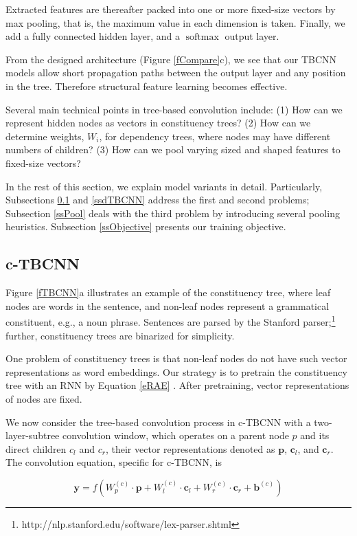 \documentclass[11pt,a4paper]{article}
\begin{document}
Extracted features are thereafter packed into one or more fixed-size vectors by max pooling, that is, the maximum value in each dimension is taken.
Finally, we add a fully connected hidden layer, and a $\operatorname{softmax}$ output layer.

From the designed architecture (Figure \ref{fCompare}c), we see that our TBCNN models allow short
propagation paths between the output layer and any position in the tree.
Therefore structural feature learning becomes effective.

Several main technical points in tree-based convolution include:
(1) How can we represent hidden nodes as vectors in constituency trees?
(2) How can we determine weights, $W_i$, for dependency trees, where nodes
may have different numbers of children?
(3) How can we pool varying sized and shaped features to fixed-size vectors?

In the rest of this section, we explain model variants in detail.
Particularly, Subsections \ref{sscTBCNN} and \ref{ssdTBCNN} address the first and second problems;
Subsection \ref{ssPool} deals with the third problem by introducing several pooling heuristics.
Subsection \ref{ssObjective} presents our training objective.
\subsection{c-TBCNN}\label{sscTBCNN}

Figure \ref{fTBCNN}a illustrates an example of the constituency tree, where
leaf nodes are words in the sentence, and
non-leaf nodes represent a grammatical constituent,
e.g., a noun phrase. Sentences are parsed by the Stanford parser;\footnote{
http://nlp.stanford.edu/software/lex-parser.shtml} further,
constituency trees are binarized for simplicity.

One problem of constituency trees is that non-leaf nodes do not have such vector representations as word embeddings.
Our strategy is to pretrain the constituency tree with an RNN by Equation \ref{eRAE} \cite{RAE}.
After pretraining, vector representations of nodes are fixed.

We now consider the tree-based convolution process in c-TBCNN with a two-layer-subtree
convolution window,
which operates on a parent node $p$ and its direct children $c_l$ and $c_r$, their vector representations denoted as $\bm p$, $\bm c_l$, and $\bm c_r$.
The convolution equation, specific for c-TBCNN, is

\vspace{-.3cm}
$$\bm y=f\left(W_p^{(c)}\!\cdot\!\bm p + W_l^{(c)}\!\cdot\!\bm c_l+W_r^{(c)}\!\cdot\!\bm c_r+\bm b^{(c)}\right)$$
\end{document}
